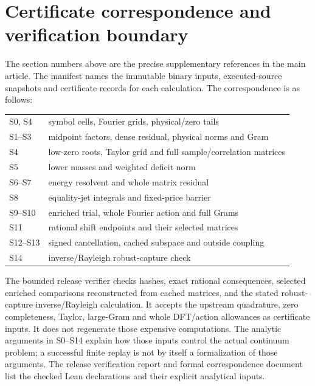 \documentclass[11pt]{article}
\numberwithin{equation}{section}
\begin{document}
\section*{Certificate correspondence and verification boundary}
The section numbers above are the precise supplementary references in
the main article. The manifest names the immutable binary inputs,
executed-source snapshots and certificate records for each calculation.
The correspondence is as follows:
\begin{center}
\begin{tabular}{ll}
S0, S4 & symbol cells, Fourier grids, physical/zero tails\\
S1--S3 & midpoint factors, dense residual, physical norms and Gram\\
S4 & low-zero roots, Taylor grid and full sample/correlation matrices\\
S5 & lower masses and weighted deficit norm\\
S6--S7 & energy resolvent and whole matrix residual\\
S8 & equality-jet integrals and fixed-price barrier\\
S9--S10 & enriched trial, whole Fourier action and full Grams\\
S11 & rational shift endpoints and their selected matrices\\
S12--S13 & signed cancellation, cached subspace and outside coupling\\
S14 & inverse/Rayleigh robust-capture check
\end{tabular}
\end{center}
The bounded release verifier checks hashes, exact rational consequences,
selected enriched comparisons reconstructed from cached matrices, and
the stated robust-capture inverse/Rayleigh calculation. It accepts the
upstream quadrature, zero completeness, Taylor, large-Gram and whole
DFT/action allowances as certificate inputs. It does not regenerate
those expensive computations. The analytic arguments in S0--S14 explain
how those inputs control the actual continuum problem; a successful
finite replay is not by itself a formalization of those arguments.
The release verification report and formal correspondence document list
the checked Lean declarations and their explicit analytical inputs.
\end{document}
